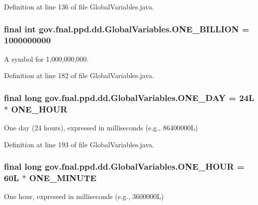 Definition at line 136 of file Global\-Variables.\-java.

\hypertarget{classgov_1_1fnal_1_1ppd_1_1dd_1_1GlobalVariables_a271c983add4bac415412025c8ac2f4cc}{
\subsubsection[{O\-N\-E\-\_\-\-B\-I\-L\-L\-I\-O\-N}]{\setlength{\rightskip}{0pt plus 5cm}final int gov.\-fnal.\-ppd.\-dd.\-Global\-Variables.\-O\-N\-E\-\_\-\-B\-I\-L\-L\-I\-O\-N = 1000000000\hspace{0.3cm}{\ttfamily [static]}}}\label{classgov_1_1fnal_1_1ppd_1_1dd_1_1GlobalVariables_a271c983add4bac415412025c8ac2f4cc}
A symbol for 1,000,000,000. 

Definition at line 182 of file Global\-Variables.\-java.

\hypertarget{classgov_1_1fnal_1_1ppd_1_1dd_1_1GlobalVariables_aef5cbdf53c9830ae609987b805a08998}{
\subsubsection[{O\-N\-E\-\_\-\-D\-A\-Y}]{\setlength{\rightskip}{0pt plus 5cm}final long gov.\-fnal.\-ppd.\-dd.\-Global\-Variables.\-O\-N\-E\-\_\-\-D\-A\-Y = 24\-L $\ast$ O\-N\-E\-\_\-\-H\-O\-U\-R\hspace{0.3cm}{\ttfamily [static]}}}\label{classgov_1_1fnal_1_1ppd_1_1dd_1_1GlobalVariables_aef5cbdf53c9830ae609987b805a08998}
One day (24 hours), expressed in milliseconds (e.\-g., 86400000\-L) 

Definition at line 193 of file Global\-Variables.\-java.

\hypertarget{classgov_1_1fnal_1_1ppd_1_1dd_1_1GlobalVariables_a947f75994e24bb52604adf3699920579}{
\subsubsection[{O\-N\-E\-\_\-\-H\-O\-U\-R}]{\setlength{\rightskip}{0pt plus 5cm}final long gov.\-fnal.\-ppd.\-dd.\-Global\-Variables.\-O\-N\-E\-\_\-\-H\-O\-U\-R = 60\-L $\ast$ O\-N\-E\-\_\-\-M\-I\-N\-U\-T\-E\hspace{0.3cm}{\ttfamily [static]}}}\label{classgov_1_1fnal_1_1ppd_1_1dd_1_1GlobalVariables_a947f75994e24bb52604adf3699920579}
One hour, expressed in milliseconds (e.\-g., 3600000\-L) 

